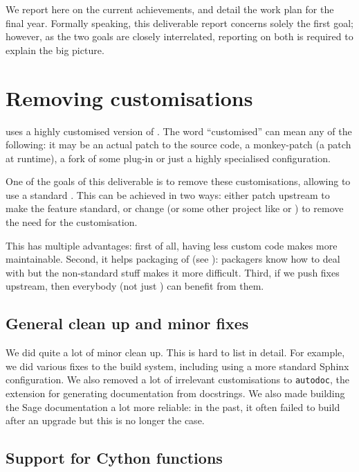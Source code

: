 \documentclass{deliverablereport}
\begin{document}
We report here on the current achievements, and detail the work plan for the
final year. Formally speaking, this deliverable report concerns solely the
first goal; however, as the two goals are closely interrelated, reporting on
both is required to explain the big picture.

\section{Removing \Sage customisations}

\Sage uses a highly customised version of \Sphinx.
The word ``customised'' can mean any of the following:
it may be an actual patch to the source code,
a monkey-patch (a patch at runtime),
a fork of some plug-in or just a highly specialised configuration.

One of the goals of this deliverable is to remove these
customisations, allowing \Sage to use a standard \Sphinx.
This can be achieved in two ways:
either patch upstream \Sphinx to make the feature standard,
or change \Sage (or some other project like \Cython or \Python)
to remove the need for the customisation.

This has multiple advantages:
first of all, having less custom code makes \Sage more maintainable.
Second, it helps packaging of \Sage
(see ):
packagers know how to deal with \Sphinx
but the non-standard \Sage stuff makes it more difficult.
Third, if we push fixes upstream, then everybody (not just \Sage)
can benefit from them.

\subsection{General clean up and minor fixes}

We did quite a lot of minor clean up.
This is hard to list in detail.
For example, we did various fixes to the build system,
including using a more standard Sphinx configuration.
We also removed a lot of irrelevant customisations to \texttt{autodoc},
the extension for generating documentation from docstrings.
We also made building the Sage documentation a lot more reliable:
in the past, it often failed to build after an upgrade
but this is no longer the case.

\subsection{Support for Cython functions}
\end{document}
